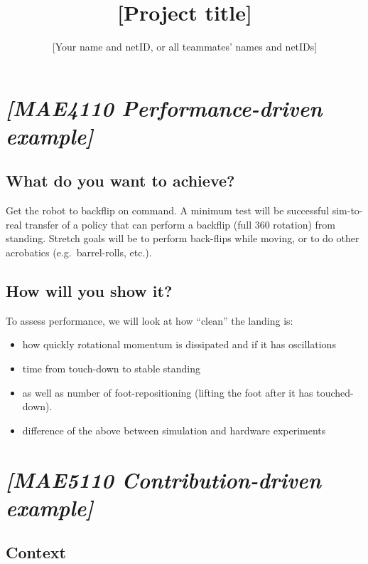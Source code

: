 \documentclass[
  11pt,
  letterpaper,
]{article}
\title{{[}Project title{]}}
\author{{[}Your name and netID, or all teammates' names and netIDs{]}}
\date{}
\makeatletter
\providecommand{\tightlist}{%
  \setlength{\itemsep}{0pt}\setlength{\parskip}{0pt}}
\renewcommand{\maketitle}{%
  \begingroup\centering
  {\Large\bfseries\@title\par}
  \vspace{0.35em}
  {\normalsize\@author\par}
  \endgroup\vspace{0.6em}}
\newif\ifoutlinefirstsection
\let\outlinesection\section
\renewcommand{\section}{%
  \ifoutlinefirstsection\outlinefirstsectionfalse\else\clearpage\fi
  \outlinesection}
\makeatother
\begin{document}
\maketitle

\section{\texorpdfstring{\emph{{[}MAE4110 Performance-driven
example{]}}}{{[}MAE4110 Performance-driven example{]}}}\label{mae4110-performance-driven-example}

\subsection{What do you want to
achieve?}\label{what-do-you-want-to-achieve}

Get the robot to backflip on command. A minimum test will be successful
sim-to-real transfer of a policy that can perform a backflip (full 360
rotation) from standing. Stretch goals will be to perform back-flips
while moving, or to do other acrobatics (e.g.~barrel-rolls, etc.).

\subsection{How will you show it?}\label{how-will-you-show-it}

To assess performance, we will look at how ``clean'' the landing is:

\begin{itemize}
\tightlist
\item
  how quickly rotational momentum is dissipated and if it has
  oscillations
\item
  time from touch-down to stable standing
\item
  as well as number of foot-repositioning (lifting the foot after it has
  touched-down).
\item
  difference of the above between simulation and hardware experiments
\end{itemize}

\section{\texorpdfstring{\emph{{[}MAE5110 Contribution-driven
example{]}}}{{[}MAE5110 Contribution-driven example{]}}}\label{mae5110-contribution-driven-example}

\subsection{Context}\label{context}
\end{document}
